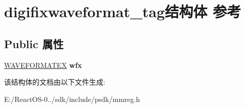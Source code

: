 \hypertarget{structdigifixwaveformat__tag}{}\section{digifixwaveformat\+\_\+tag结构体 参考}
\label{structdigifixwaveformat__tag}
\subsection*{Public 属性}
\begin{DoxyCompactItemize}
\item 
\mbox{\label{structdigifixwaveformat__tag_a65ec00d0f8537cc75fd18369c2e3df0d}} 
\hyperlink{struct_w_a_v_e_f_o_r_m_a_t_e_x}{W\+A\+V\+E\+F\+O\+R\+M\+A\+T\+EX} {\bfseries wfx}
\end{DoxyCompactItemize}


该结构体的文档由以下文件生成\+:\begin{DoxyCompactItemize}
\item 
E\+:/\+React\+O\+S-\/0../sdk/include/psdk/mmreg.\+h\end{DoxyCompactItemize}
